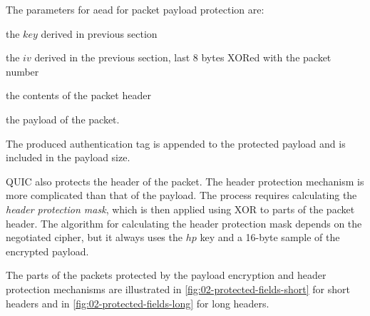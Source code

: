 The parameters for \gls{aead} for packet payload protection are:

\begin{itemize}

     the $key$ derived in previous section

     the $iv$ derived in the previous section, last 8 bytes XORed with the packet
number

     the contents of the packet header

     the payload of the packet.

\end{itemize}

The produced authentication tag is appended to the protected payload and is included in the payload
size.

QUIC also protects the header of the packet. The header protection mechanism is more complicated
than that of the payload. The process requires calculating the \textit{header protection mask},
which is then applied using XOR to parts of the packet header. The algorithm for calculating the
header protection mask depends on the negotiated cipher, but it always uses the $hp$ key and a
16-byte sample of the encrypted payload.

The parts of the packets protected by the payload encryption and header protection mechanisms are
illustrated in \autoref{fig:02-protected-fields-short} for short headers and in
\autoref{fig:02-protected-fields-long} for long headers.

